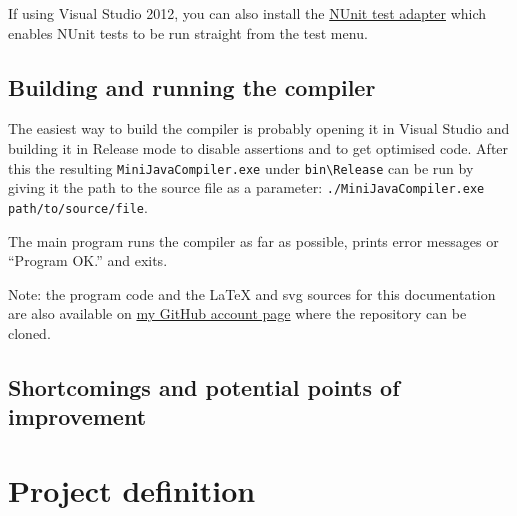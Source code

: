\documentclass[a4paper,11pt]{article}
\begin{document}
If using Visual Studio 2012, you can also install the \href{http://nunit.org/index.php?p=vsTestAdapter&r=2.6.1}{NUnit test adapter} which enables NUnit tests to be run straight from the test menu.

\subsection{Building and running the compiler}

The easiest way to build the compiler is probably opening it in Visual Studio and building it in Release mode to disable assertions and to get optimised code. After this the resulting \verb,MiniJavaCompiler.exe, under \verb,bin\Release, can be run by giving it the path to the source file as a parameter: \verb,./MiniJavaCompiler.exe path/to/source/file,.

The main program runs the compiler as far as possible, prints error messages or ``Program OK.'' and exits.

Note: the program code and the \LaTeX{} and svg sources for this documentation are also available on \href{https://github.com/Lateks/MiniJavaCompiler}{my GitHub account page} where the repository can be cloned.

\subsection{Shortcomings and potential points of improvement}

\appendix
\section{Project definition}
\end{document}

